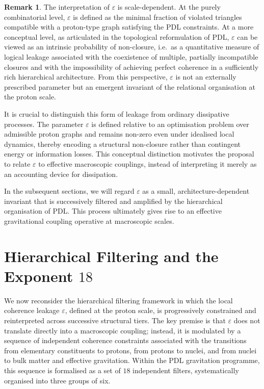 \documentclass[11pt,a4paper]{article}
\theoremstyle{definition}
\newtheorem{remark}[theorem]{Remark}
\begin{document}
\begin{remark}
The interpretation of $\varepsilon$ is scale-dependent. At the purely combinatorial level, $\varepsilon$ is defined as the minimal fraction of violated triangles compatible with a proton-type graph satisfying the PDL constraints.\cite{Combinatorial_Proton_v2_2026} At a more conceptual level, as articulated in the topological reformulation of PDL, $\varepsilon$ can be viewed as an intrinsic probability of non-closure, i.e.\ as a quantitative measure of logical leakage associated with the coexistence of multiple, partially incompatible closures and with the impossibility of achieving perfect coherence in a sufficiently rich hierarchical architecture.\cite{Topological_Reformulation_PDL_2026} From this perspective, $\varepsilon$ is not an externally prescribed parameter but an emergent invariant of the relational organisation at the proton scale.

It is crucial to distinguish this form of leakage from ordinary dissipative processes. The parameter $\varepsilon$ is defined relative to an optimisation problem over admissible proton graphs and remains non-zero even under idealised local dynamics, thereby encoding a structural non-closure rather than contingent energy or information losses.\cite{Exponent_18_PDL_2026,PDL_Global_Mapping_2026} This conceptual distinction motivates the proposal to relate $\varepsilon$ to effective macroscopic couplings, instead of interpreting it merely as an accounting device for dissipation.
\end{remark}

In the subsequent sections, we will regard $\varepsilon$ as a small, architecture-dependent invariant that is successively filtered and amplified by the hierarchical organisation of PDL. This process ultimately gives rise to an effective gravitational coupling operative at macroscopic scales.\cite{Exponent_18_PDL_2026,Effective_Fields_PDL_2026}

\section{Hierarchical Filtering and the Exponent \texorpdfstring{$18$}{18}}
\label{sec:hierarchical_filters}

We now reconsider the hierarchical filtering framework in which the local coherence leakage $\varepsilon$, defined at the proton scale, is progressively constrained and reinterpreted across successive structural tiers. The key premise is that $\varepsilon$ does not translate directly into a macroscopic coupling; instead, it is modulated by a sequence of independent coherence constraints associated with the transitions from elementary constituents to protons, from protons to nuclei, and from nuclei to bulk matter and effective gravitation.\cite{Exponent_18_PDL_2026,PDL_Global_Mapping_2026} Within the PDL gravitation programme, this sequence is formalised as a set of $18$ independent filters, systematically organised into three groups of six.
\end{document}
